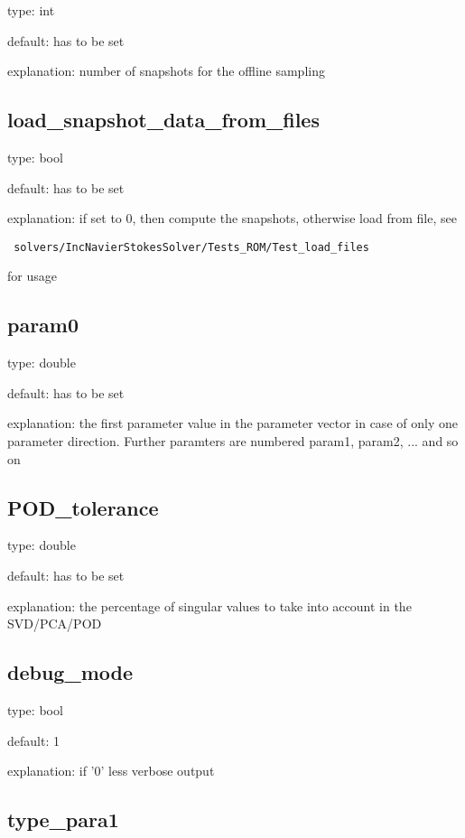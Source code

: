 \documentclass[a4paper,10pt]{article}
\begin{document}
\noindent type: int

\noindent default: has to be set

\noindent explanation: number of snapshots for the offline sampling


\subsection{load\_snapshot\_data\_from\_files}

\noindent type: bool

\noindent default: has to be set

\noindent explanation: if set to 0, then compute the snapshots, otherwise load from file, see
\begin{verbatim}
 solvers/IncNavierStokesSolver/Tests_ROM/Test_load_files
\end{verbatim}
for usage


\subsection{param0}

\noindent type: double

\noindent default: has to be set

\noindent explanation: the first parameter value in the parameter vector in case of only one parameter direction. Further paramters are numbered param1, param2, ... and so on

\subsection{POD\_tolerance}

\noindent type: double

\noindent default: has to be set

\noindent explanation: the percentage of singular values to take into account in the SVD/PCA/POD


\subsection{debug\_mode}

\noindent type: bool

\noindent default: 1

\noindent explanation: if '0' less verbose output

\subsection{type\_para1}
\end{document}

